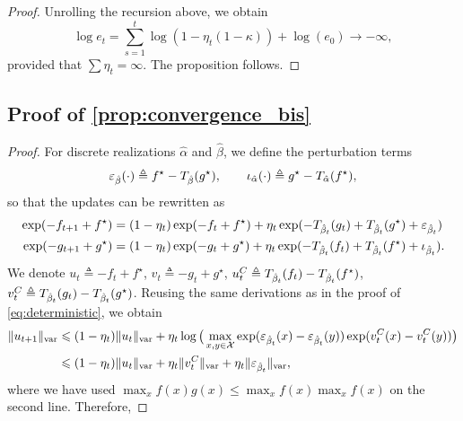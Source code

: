 \begin{proof}
    Unrolling the recursion above, we obtain
    \begin{equation}
        \log e_t = \sum_{s=1}^t \log(1 - \eta_t (1 - \kappa)) + \log(e_0) \to - \infty,
    \end{equation}
    provided that $\sum \eta_t = \infty$. The proposition follows.
\end{proof}

\subsection{Proof of \autoref{prop:convergence_bis}}

\begin{proof}
For discrete realizations $\hat \alpha$ and $\hat \beta$, we define the perturbation terms
\begin{equation}
    \epsilon_{\hat \beta}(\cdot) \triangleq
    f^\star - \Ctrans{g^\star}{\hat \beta} ,\qquad
    \iota_{\hat \alpha}(\cdot) \triangleq 
    g^\star - \Ctrans{f^\star}{\hat \alpha},
\end{equation}
so that the updates can be rewritten as
\begin{align}
    \exp(-f_{t+1} + f^\star) &= (1 - \eta_t)
    \exp(-f_{t} + f^\star)
    + \eta_t \exp(-\Ctrans{g_t}{\hat \beta_t} 
    +\Ctrans{g^\star}{\hat \beta_t} + \epsilon_{\hat \beta_t}) \\
    \exp(-g_{t+1} + g^\star) &= (1 - \eta_t)
    \exp(-g_{t} + g^\star)
    + \eta_t \exp(-\Ctrans{f_t}{\hat \beta_t} 
    +\Ctrans{f^\star}{\hat \beta_t} + \iota_{\hat \beta_t}).
\end{align}
We denote $u_t \triangleq -f_{t} + f^\star$, $v_t \triangleq -g_{t} + g^\star$, $u_t^C \triangleq
\Ctrans{f_t}{\hat \beta_t} - \Ctrans{f^\star}{\hat \beta_t}$, $v_t^C \triangleq
\Ctrans{g_t}{\hat \beta_t} - \Ctrans{g^\star}{\hat \beta_t}$. Reusing the same
derivations as in the proof of \autoref{eq:deterministic}, we obtain
    \label{eq:pre_ineq_var}
    \begin{align}
    \Vert u_{t+1} \Vert_{\var} &\leq
    (1 - \eta_t) \Vert u_t \Vert_{\var}
    + \eta_t \log \big( \max_{x, y \in \Xx}
    \exp(\epsilon_{\hat \beta_t}(x) 
    - \epsilon_{\hat \beta_t}(y)) \exp(v_t^C(x) - v_t^C(y)) \big) \\ 
    &\leq
    (1 - \eta_t) \Vert u_t \Vert_{\var}
    + \eta_t \Vert v_t^C \Vert_{\var}
    + \eta_t \Vert \epsilon_{\hat \beta_t} \Vert_{\var},
\end{align}
where we have used $\max_x f(x) g(x) \leq \max_x f(x) \max_x f(x)$ on the second line. Therefore,

\end{proof}
